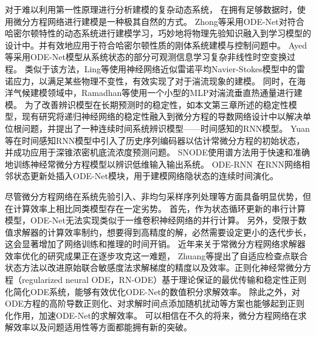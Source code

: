 对于难以利用第一性原理进行分析建模的复杂动态系统，
在拥有足够数据时，使用微分方程网络进行建模是一种极其自然的方式。
Zhong等\cite{zhong2019symplectic}采用ODE-Net对符合哈密尔顿特性的动态系统进行建模学习，巧妙地将物理先验知识融入到学习模型的设计中。并有效地应用于符合哈密尔顿性质的刚体系统建模与控制问题中。
Ayed等\cite{ayed2019learning}采用ODE-Net模型从系统状态的部分可观测信息学习复杂非线性时空变换过程。
类似于该方法，Ling等\cite{ling2016reynolds}使用神经网络近似雷诺平均Navier-Stokes模型中的雷诺应力，以满足某些物理不变性，有效实现了对于湍流现象的建模。
同时，在海洋气候建模领域中，Ramadhan等\cite{ramadhan2020capturing}使用一个小型的MLP对湍流垂直热通量进行建模。
为了改善辨识模型在长期预测时的稳定性，如本文第三章所述的稳定性模型，现有研究\cite{Demeester2019}将递归神经网络的稳定性融入到微分方程的导数网络设计中以解决单位根问题，并提出了一种连续时间系统辨识模型——时间感知的RNN模型。
Yuan等\cite{Yuan2022}在时间感知RNN模型中引入了历史序列编码器以估计常微分方程的初始状态，并成功应用于深锥浓密机底流浓度预测问题。
SNODE\cite{Quaglino2019}使用谱方法用于快速和准确地训练神经常微分方程模型以辨识低维输入输出系统。
ODE-RNN~\cite{Rubanova2019}在RNN网络相邻状态更新处插入ODE-Net模块，用于建模网络隐状态的连续时间演化。



尽管微分方程网络在系统先验引入、非均匀采样序列处理等方面具备明显优势，但在计算效率上相比同类模型存在一定劣势。
首先，作为状态循环更新的串行计算模型，ODE-Net无法实现类似于一维卷积神经网络的并行计算。
另外，受限于数值求解器的计算效率制约，想要得到高精度的解，必然需要设定更小的迭代步长，这会显著增加了网络训练和推理的时间开销。
近年来关于常微分方程网络求解器效率优化的研究成果正在逐步攻克这一难题，
Zhuang等\cite{Zhuang2020}提出了自适应检查点联合状态方法以改进原始联合敏感度法求解梯度的精度以及效率。正则化神经常微分方程（regularized neural ODE，RN-ODE）\cite{J2020}基于理论保证的最优传输和稳定性正则化简化ODE系统，能够有效优化ODE-Net的数值积分求解效率。
除此之外，对ODE方程的高阶导数正则化\cite{kelly2020}、对求解时间点添加随机扰动\cite{Ghosh2020}等方案也能够起到正则化作用，加速ODE-Net的求解效率。
可以相信在不久的将来，微分方程网络在求解效率以及问题适用性等方面都能拥有新的突破。


